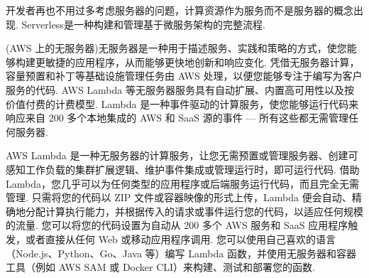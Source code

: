 \begin{definition}[Serverless]
    开发者再也不用过多考虑服务器的问题，计算资源作为服务而不是服务器的概念出现. Serverless是一种构建和管理基于微服务架构的完整流程.

    (AWS 上的无服务器)无服务器是一种用于描述服务、实践和策略的方式，使您能够构建更敏捷的应用程序，从而能够更快地创新和响应变化. 凭借无服务器计算，容量预置和补丁等基础设施管理任务由 AWS 处理，以便您能够专注于编写为客户服务的代码. AWS Lambda 等无服务器服务具有自动扩展、内置高可用性以及按价值付费的计费模型. Lambda 是一种事件驱动的计算服务，使您能够运行代码来响应来自 200 多个本地集成的 AWS 和 SaaS 源的事件 — 所有这些都无需管理任何服务器. 
\end{definition}

\begin{definition}
    AWS Lambda 是一种无服务器的计算服务，让您无需预置或管理服务器、创建可感知工作负载的集群扩展逻辑、维护事件集成或管理运行时，即可运行代码. 借助 Lambda，您几乎可以为任何类型的应用程序或后端服务运行代码，而且完全无需管理. 只需将您的代码以 ZIP 文件或容器映像的形式上传，Lambda 便会自动、精确地分配计算执行能力，并根据传入的请求或事件运行您的代码，以适应任何规模的流量. 您可以将您的代码设置为自动从 200 多个 AWS 服务和 SaaS 应用程序触发，或者直接从任何 Web 或移动应用程序调用. 您可以使用自己喜欢的语言（Node.js、Python、Go、Java 等）编写 Lambda 函数，并使用无服务器和容器工具（例如 AWS SAM 或 Docker CLI）来构建、测试和部署您的函数. 
\end{definition}

